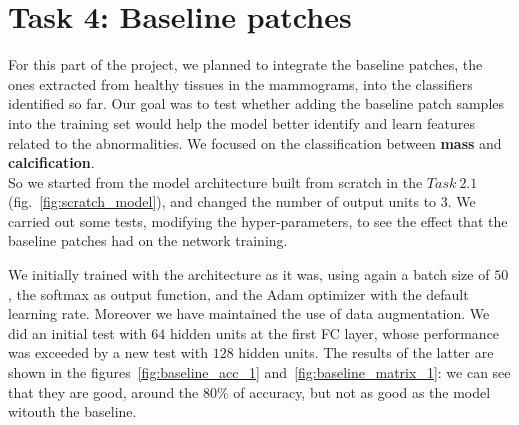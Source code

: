 \documentclass[11pt,a4paper,oneside]{article}
\begin{document}
\clearpage

\section{Task 4: Baseline patches}
For this part of the project, we planned to integrate the baseline patches, the ones extracted from healthy tissues in the mammograms, into the classifiers identified so far. Our goal was to test whether adding the baseline patch samples into the training set would help the model better identify and learn features related to the abnormalities.
We focused on the classification between \textbf{mass} and \textbf{calcification}. \\
So we started from the model architecture built from scratch in the $Task\ 2.1$ (fig.~\ref{fig:scratch_model}), and changed the number of output units to $3$. We carried out some tests, modifying the hyper-parameters, to see the effect that the baseline patches had on the network training.

We initially trained with the architecture as it was, using again a batch size of $50$, the softmax as output function, and the Adam optimizer with the default learning rate. Moreover we have maintained the use of data augmentation. We did an initial test with $64$ hidden units at the first FC layer, whose performance was exceeded by a new test with $128$ hidden units. The results of the latter are shown in the figures~\ref{fig:baseline_acc_1} and~\ref{fig:baseline_matrix_1}: we can see that they are good, around the $80\%$ of accuracy, but not as good as the model witouth the baseline. 
\end{document}
